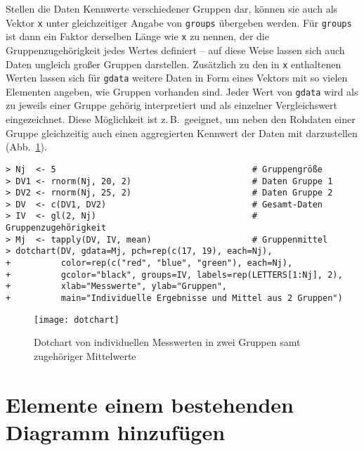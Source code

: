 Stellen die Daten Kennwerte verschiedener Gruppen dar, können sie auch als Vektor \lstinline!x! unter gleichzeitiger Angabe von \lstinline!groups! übergeben werden. Für \lstinline!groups! ist dann ein Faktor derselben Länge wie \lstinline!x! zu nennen, der die Gruppenzugehörigkeit jedes Wertes definiert -- auf diese Weise lassen sich auch Daten ungleich großer Gruppen darstellen. Zusätzlich zu den in \lstinline!x! enthaltenen Werten lassen sich für \lstinline!gdata! weitere Daten in Form eines Vektors mit so vielen Elementen angeben, wie Gruppen vorhanden sind. Jeder Wert von \lstinline!gdata! wird als zu jeweils einer Gruppe gehörig interpretiert und als einzelner Vergleichswert eingezeichnet. Diese Möglichkeit ist z.\,B.\ geeignet, um neben den Rohdaten einer Gruppe gleichzeitig auch einen aggregierten Kennwert der Daten mit darzustellen (Abb.\ \ref{fig:dotchart}).
\begin{lstlisting}
> Nj  <- 5                                       # Gruppengröße
> DV1 <- rnorm(Nj, 20, 2)                        # Daten Gruppe 1
> DV2 <- rnorm(Nj, 25, 2)                        # Daten Gruppe 2
> DV  <- c(DV1, DV2)                             # Gesamt-Daten
> IV  <- gl(2, Nj)                               # Gruppenzugehörigkeit
> Mj  <- tapply(DV, IV, mean)                    # Gruppenmittel
> dotchart(DV, gdata=Mj, pch=rep(c(17, 19), each=Nj),
+          color=rep(c("red", "blue", "green"), each=Nj),
+          gcolor="black", groups=IV, labels=rep(LETTERS[1:Nj], 2),
+          xlab="Messwerte", ylab="Gruppen",
+          main="Individuelle Ergebnisse und Mittel aus 2 Gruppen")
\end{lstlisting}

\begin{figure}[ht]
\centering
\texttt{[image: dotchart]}
\vspace*{-1em}
\caption{Dotchart von individuellen Messwerten in zwei Gruppen samt zugehöriger Mittelwerte}
\label{fig:dotchart}
\end{figure}

\section{Elemente einem bestehenden Diagramm hinzufügen}
\label{sec:graphAddElem}

